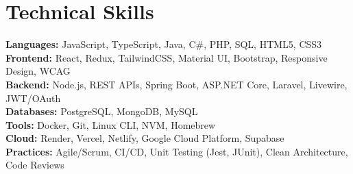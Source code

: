 \documentclass[10pt]{article}
\begin{document}
\section*{Technical Skills}
\textbf{Languages:} JavaScript, TypeScript, Java, C\#, PHP, SQL, HTML5, CSS3\\
\textbf{Frontend:} React, Redux, TailwindCSS, Material UI, Bootstrap, Responsive Design, WCAG\\
\textbf{Backend:} Node.js, REST APIs, Spring Boot, ASP.NET Core, Laravel, Livewire, JWT/OAuth\\
\textbf{Databases:} PostgreSQL, MongoDB, MySQL\\
\textbf{Tools:} Docker, Git, Linux CLI, NVM, Homebrew\\
\textbf{Cloud:} Render, Vercel, Netlify, Google Cloud Platform, Supabase\\
\textbf{Practices:} Agile/Scrum, CI/CD, Unit Testing (Jest, JUnit), Clean Architecture, Code Reviews
\end{document}
